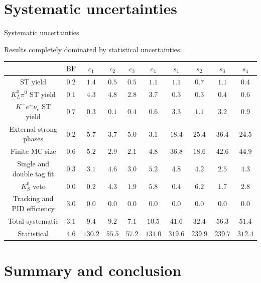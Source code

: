 \documentclass{beamer}
\begin{document}
\section{Systematic uncertainties}
\begin{frame}{Systematic uncertainties}
  \begin{center}
    {\large Results completely dominated by statistical uncertainties:}
  \end{center}
  \begin{center}
    \tiny
    \begin{tabular}{|cccccccccc|}
      \hline
      & ${\rm BF}$ & $c_1$ & $c_2$ & $c_3$ & $c_4$ & $s_1$ & $s_2$ & $s_3$ & $s_4$ \\
      \hline
      ST yield                    & $0.2$ & $1.4$ & $0.5$ & $0.5$ & $1.1$ & $1.1$ & $0.7$ & $1.1$ & $0.4$ \\
      $K_L^0\pi^0$ ST yield       & $0.1$ & $4.3$ & $4.8$ & $2.8$ & $3.7$ & $0.3$ & $0.3$ & $0.4$ & $0.6$ \\
      $K^- e^+\nu_e$ ST yield     & $0.7$ & $0.3$ & $0.1$ & $0.4$ & $0.6$ & $3.3$ & $1.1$ & $3.2$ & $0.9$ \\
      External strong phases      & $0.2$ & $5.7$ & $3.7$ & $5.0$ & $3.1$ & $18.4$ & $25.4$ & $36.4$ & $24.5$ \\
      Finite MC size              & $0.6$ & $5.2$ & $2.9$ & $2.1$ & $4.8$ & $36.8$ & $18.6$ & $42.6$ & $44.9$ \\
      Single and double tag fit   & $0.3$ & $3.1$ & $4.6$ & $3.0$ & $5.2$ & $4.8$ & $4.2$ & $2.5$ & $4.3$ \\
      $K_S^0$ veto                & $0.0$ & $0.2$ & $4.3$ & $1.9$ & $5.8$ & $0.4$ & $6.2$ & $1.7$ & $2.8$ \\
      Tracking and PID efficiency & $3.0$ & $0.0$ & $0.0$ & $0.0$ & $0.0$ & $0.0$ & $0.0$ & $0.0$ & $0.0$ \\
      \hline
      Total systematic            & $3.1$ & $9.4$ & $9.2$ & $7.1$ & $10.5$ & $41.6$ & $32.4$ & $56.3$ & $51.4$ \\
      \hline
      Statistical                 & $4.6$ & $130.2$ & $55.5$ & $57.2$ & $131.0$ & $319.6$ & $239.9$ & $239.7$ & $312.4$ \\
      \hline
    \end{tabular}
  \end{center}
\end{frame}

\section{Summary and conclusion}
\end{document}
